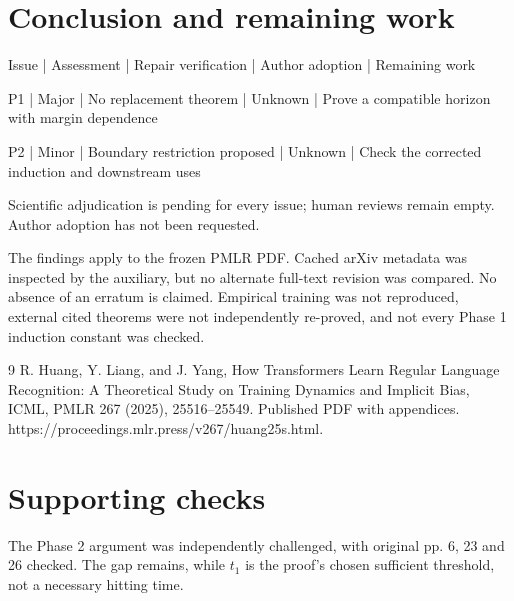 \documentclass[10pt]{article}
\begin{document}
\section*{Conclusion and remaining work}
Issue | Assessment | Repair verification | Author adoption | Remaining work\par
P1 | Major | No replacement theorem | Unknown | Prove a compatible horizon with margin dependence\par
P2 | Minor | Boundary restriction proposed | Unknown | Check the corrected induction and downstream uses\par
Scientific adjudication is pending for every issue; human reviews remain empty. Author adoption has not been requested.\par
The findings apply to the frozen PMLR PDF. Cached arXiv metadata was inspected by the auxiliary, but no alternate full-text revision was compared. No absence of an erratum is claimed. Empirical training was not reproduced, external cited theorems were not independently re-proved, and not every Phase 1 induction constant was checked.\par
9 R. Huang, Y. Liang, and J. Yang, How Transformers Learn Regular Language Recognition: A Theoretical Study on Training Dynamics and Implicit Bias, ICML, PMLR 267 (2025), 25516–25549. Published PDF with appendices. https://proceedings.mlr.press/v267/huang25s.html.\par
\section*{Supporting checks}
The Phase 2 argument was independently challenged, with original pp. 6, 23 and 26 checked. The gap remains, while \(t_1\) is the proof’s chosen sufficient threshold, not a necessary hitting time.\par
\end{document}
